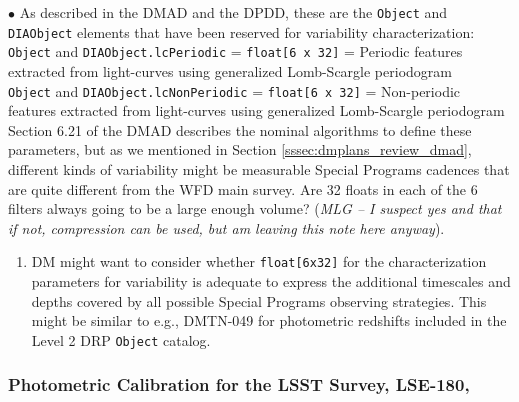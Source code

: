 \documentclass[DM,lsstdraft,toc]{lsstdoc}
\begin{document}
$\bullet$ As described in the DMAD and the DPDD, these are the {\tt Object} and {\tt DIAObject} elements that have been reserved for variability characterization: \\
{\tt Object} and {\tt DIAObject.lcPeriodic} = {\tt float[6 x 32]} = Periodic features extracted from light-curves using generalized Lomb-Scargle periodogram \\
{\tt Object} and {\tt DIAObject.lcNonPeriodic} = {\tt float[6 x 32]} = Non-periodic features extracted from light-curves using generalized Lomb-Scargle periodogram \\
Section 6.21 of the DMAD describes the nominal algorithms to define these parameters, but as we mentioned in Section \ref{sssec:dmplans_review_dmad}, different kinds of variability might be measurable Special Programs cadences that are quite different from the WFD main survey. Are 32 floats in each of the 6 filters always going to be a large enough volume? ({\it MLG -- I suspect yes and that if not, compression can be used, but am leaving this note here anyway}).
\begin{enumerate}[resume,topsep=-10pt,label= \textbf{Concern \Roman*.}] \item \label{C10} DM might want to consider whether {\tt float[6x32]} for the characterization parameters for variability is adequate to express the additional timescales and depths covered by all possible Special Programs observing strategies. This might be similar to e.g., DMTN-049 for photometric redshifts included in the Level 2 DRP {\tt Object} catalog. \end{enumerate}


\subsubsection{Photometric Calibration for the LSST Survey, LSE-180, \cite{LSE-180}}
\end{document}
